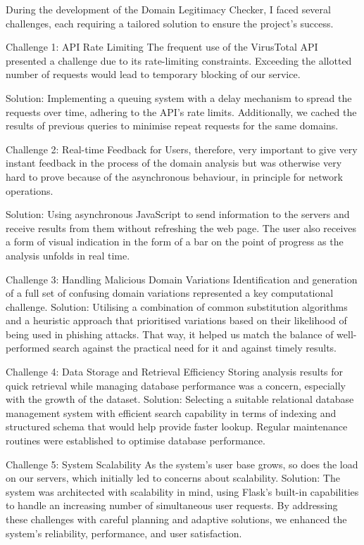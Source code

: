 During the development of the Domain Legitimacy Checker, I faced several challenges, each requiring a tailored solution to ensure the project's success.

Challenge 1: API Rate Limiting
The frequent use of the VirusTotal API presented a challenge due to its rate-limiting constraints. Exceeding the allotted number of requests would lead to temporary blocking of our service.

Solution: Implementing a queuing system with a delay mechanism to spread the requests over time, adhering to the API's rate limits. Additionally, we cached the results of previous queries to minimise repeat requests for the same domains.

Challenge 2: Real-time Feedback for Users, therefore, very important to give very instant feedback in the process of the domain analysis but was otherwise very hard to prove because of the asynchronous behaviour, in principle for network operations.

Solution: Using asynchronous JavaScript to send information to the servers and receive results from them without refreshing the web page. The user also receives a form of visual indication in the form of a bar on the point of progress as the analysis unfolds in real time.

Challenge 3: Handling Malicious Domain Variations
Identification and generation of a full set of confusing domain variations represented a key computational challenge.
Solution: Utilising a combination of common substitution algorithms and a heuristic approach that prioritised variations based on their likelihood of being used in phishing attacks. That way, it helped us match the balance of well-performed search against the practical need for it and against timely results.

Challenge 4: Data Storage and Retrieval Efficiency
Storing analysis results for quick retrieval while managing database performance was a concern, especially with the growth of the dataset.
Solution: Selecting a suitable relational database management system with efficient search capability in terms of indexing and structured schema that would help provide faster lookup. Regular maintenance routines were established to optimise database performance.

Challenge 5: System Scalability
As the system's user base grows, so does the load on our servers, which initially led to concerns about scalability.
Solution: The system was architected with scalability in mind, using Flask's built-in capabilities to handle an increasing number of simultaneous user requests. 
By addressing these challenges with careful planning and adaptive solutions, we enhanced the system's reliability, performance, and user satisfaction.

